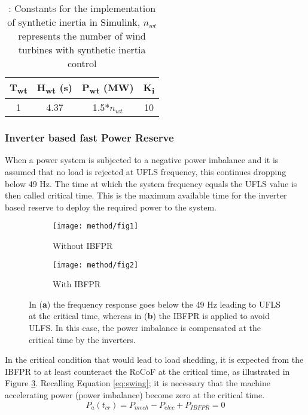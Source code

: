 \begin{table}[h]
\caption{\label{tb:inertia}: Constants for the implementation of synthetic inertia in Simulink, $ n_{wt} $ represents the number of wind turbines with synthetic inertia control}
\centering
\begin{tabular}{cccc}
\toprule
\textbf{T\textsubscript{wt}} & \textbf{ H\textsubscript{wt} (s)}	& \textbf{ P\textsubscript{wt} (MW)} & \textbf{ K\textsubscript{i}} \\
\midrule
1 & 4.37 & 1.5*$ n_{wt} $ & 10 \\
\bottomrule
\end{tabular}
\end{table}

\subsubsection{Inverter based fast Power Reserve}

When a power system is subjected to a negative power imbalance and it is assumed that no load is rejected at UFLS frequency, this continues dropping below 49 Hz. The time at which the system frequency equals the UFLS value is then called critical time. This is the maximum available time for the inverter based reserve to deploy the required power to the system.

\begin{figure}[h]
\centering
\begin{subfigure}[h]{0.45\textwidth}
\centering
\texttt{[image: method/fig1]}
\caption{Without IBFPR}
\label{fig:freqresp_before}
\end{subfigure}
\hfill
\begin{subfigure}[h]{0.45\textwidth}
\centering
\texttt{[image: method/fig2]}
\caption{With IBFPR}
\label{fig:freqresp_after}
\end{subfigure}


\caption{In (\textbf{a}) the frequency response goes below the 49 Hz leading to UFLS at the critical time, whereas in (\textbf{b}) the IBFPR is applied to avoid ULFS. In this case, the power imbalance is compensated at the critical time by the inverters.}
\end{figure}

In the critical condition that would lead to load shedding, it is expected from the IBFPR to at least counteract the RoCoF at the critical time, as illustrated in Figure \ref{fig:freqresp_after}.
Recalling Equation \eqref{eq:swing}; it is necessary that the machine accelerating power (power imbalance) become zero at the critical time.
\begin{equation}
\label{eq:powerbalance}
P_a (t_{cr} )=P_{mech}-P_{elec}+P_{IBFPR}=0
\end{equation}

